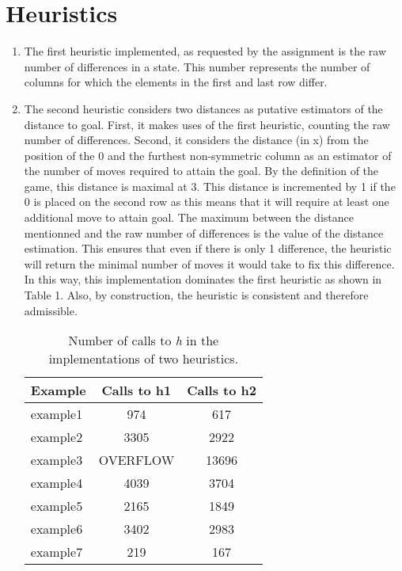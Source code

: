 \documentclass[12pt]{article}
\begin{document}
\section{Heuristics}
\begin{enumerate}[(1)]
\item
The first heuristic implemented, as requested by the assignment is the raw number of differences in a state.  This number represents the number of columns for which the elements in the first and last row differ.
\item
The second heuristic considers two distances as putative estimators of the distance to goal.  First, it makes uses of the first heuristic, counting the raw number of differences.  Second, it considers the distance (in x) from the position of the 0 and the furthest non-symmetric column as an estimator of the number of moves required to attain the goal.  By the definition of the game, this distance is maximal at 3.  This distance is incremented by 1 if the 0 is placed on the second row as this means that it will require at least one additional move to attain goal.  The maximum between the distance mentionned and the raw number of differences is the value of the distance estimation.  This ensures that even if there is only 1 difference, the heuristic will return the minimal number of moves it would take to fix this difference.  In this way, this implementation dominates the first heuristic as shown in Table 1.  Also, by construction, the heuristic is consistent and therefore admissible.\\
 
\begin{table}[h!]
\begin{center}
\begin{tabular} {| l || c | c |}
\hline
Example & Calls to h1 & Calls to h2 \\
\hline
example1 & 974 & 617 \\
example2 & 3305 & 2922 \\
example3 & OVERFLOW & 13696 \\
example4 & 4039 & 3704\\
example5 & 2165 & 1849 \\
example6 & 3402 & 2983\\
example7 & 219 & 167\\
\hline
\end{tabular}
\caption{Number of calls to \textit{h} in the implementations of two heuristics.}
\end{center}
\end{table}
\end{enumerate}
\end{document}
